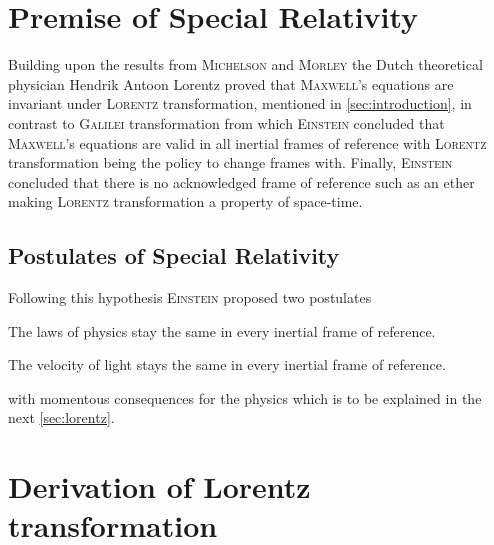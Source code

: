 \documentclass[12pt,
               open=any,
               twoside,
               a4paper,
               titlepage,
               bibliography=totoc,
               xcolor=dvipsnames,
               ]{scrartcl}
\theoremstyle{definition}
\theoremstyle{definition}
\begin{document}
\newpage
	
	\section{Premise of Special Relativity}
	\label{sec:premise}
	
		Building upon the results from \textsc{Michelson} and \textsc{Morley} the Dutch theoretical physician Hendrik Antoon Lorentz proved that \textsc{Maxwell}'s equations are invariant under \textsc{Lorentz} transformation, mentioned in \autoref{sec:introduction}, in contrast to \textsc{Galilei} transformation from which \textsc{Einstein} concluded that \textsc{Maxwell}'s equations are valid in all inertial frames of reference with \textsc{Lorentz} transformation being the policy to change frames with. Finally, \textsc{Einstein} concluded that there is no acknowledged frame of reference such as an ether making  \textsc{Lorentz} transformation a property of space-time.
	
		\subsection{Postulates of Special Relativity}
		\label{subsec:postulates}
		
			Following this hypothesis \textsc{Einstein} proposed two postulates
			\begin{postulate}
				The laws of physics stay the same in every inertial frame of reference.
			\end{postulate}
			\begin{postulate}
				The velocity of light stays the same in every inertial frame of reference.
			\end{postulate}
			with momentous consequences for the physics which is to be explained in the next \autoref{sec:lorentz}.

		\section{Derivation of Lorentz transformation}
		\label{sec:lorentz}
		
\end{document}

